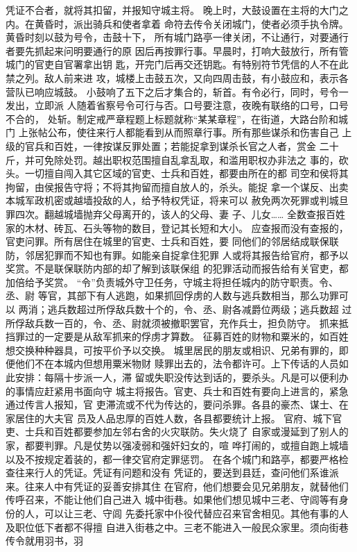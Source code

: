 \documentclass[12pt,UTF8]{ctexbook}
\begin{document}
凭证不合者，就将其扣留，并报知守城主将。 
晚上时，大鼓设置在主将的大门之内。在黄昏时，派出骑兵和使者拿着 
命符去传令关闭城门，使者必须手执令牌。黄昏时刻以鼓为号令，击鼓十下， 
所有城门路亭一律关闭，不让通行，对要通行者要先抓起来问明要通行的原 
因后再按罪行事。早晨时，打响大鼓放行，所有管城门的官吏自官署拿出钥 
匙，开完门后再交还钥匙。有特别符节凭信的人不在此禁之列。敌人前来进 
攻，城楼上击鼓五次，又向四周击鼓，有小鼓应和，表示各营队已响应城鼓。 
小鼓响了五下之后才集合的，斩首。有令必行，同时，号令一发出，立即派 
人随着省察号令可行与否。口号要注意，夜晚有联络的口号，口号不合的， 
处斩。制定戒严章程题上标题就称“某某章程”，在街道，大路台阶和城门 
上张帖公布，使往来行人都能看到从而照章行事。所有那些谋杀和伤害自己 
上级的官兵和百姓，一律按谋反罪处置；若能捉拿到谋杀长官之人者，赏金 
二十斤，并可免除处罚。越出职权范围擅自乱拿乱取，和滥用职权办非法之 
事的，砍头。一切擅自闯入其它区域的官吏、士兵和百姓，都要由所在的都 
司空和侯将其拘留，由侯报告守将；不将其拘留而擅自放人的，杀头。能捉 
拿一个谋反、出卖本城军政机密或越墙投敌的人，给予特权凭证，将来可以 
赦免两次死罪或判城旦罪四次。翻越城墙抛弃父母离开的，该人的父母、妻 
子、儿女…… 
全数查报百姓家的木材、砖瓦、石头等物的数目，登记其长短和大小。 
应查报而没有查报的，官吏问罪。所有居住在城里的官吏、士兵和百姓，要 
同他们的邻居结成联保联防，邻居犯罪而不知也有罪。如能亲自捉拿住犯罪 
人或将其报告给官府，都予以奖赏。不是联保联防内部的却了解到该联保组 
的犯罪活动而报告给有关官吏，都加倍给予奖赏。 
“令”负责城外守卫任务，守城主将担任城内的防守职责。令、丞、尉 
等官，其部下有人逃跑，如果抓回俘虏的人数与逃兵数相当，那么功罪可以 
两消；逃兵数超过所俘敌兵数十个的，令、丞、尉各减爵位两级；逃兵数超 
过所俘敌兵数一百的，令、丞、尉就须被撤职罢官，充作兵士，担负防守。 
抓来抵挡罪过的一定要是从敌军抓来的俘虏才算数。 
征募百姓的财物和粟米的，如百姓想交换种种器具，可按平价予以交换。 
城里居民的朋友或相识、兄弟有罪的，即便他们不在本城内但想用粟米物财 
赎罪出去的，法令都许可。上下传话的人员如此安排：每隔十步派一人，滞 
留或失职没传达到话的，要杀头。凡是可以便利办的事情应赶紧用书面向守 
城主将报告。官吏、兵士和百姓有要向上进言的，紧急通过传言人报知，官 
吏滞流或不代为传达的，要问杀罪。各县的豪杰、谋士、在家居住的大夫官 
员及人品忠厚的百姓人数，各县都要统计上报。 
官府、城下官吏、士兵和百姓都要参加左邻右舍的火灾联防。失火烧了 
自家或漫延到了别人的家，都要判罪。凡是仗势以强凌弱和强奸妇女的，喧 
哗打闹的，或擅自跑上城墙以及不按规定着装的，都一律交官府定罪惩罚。 
在各个城门和路亭，都要严格检查往来行人的凭证。凭证有问题和没有 
凭证的，要送到县廷，查问他们系谁派来。往来人中有凭证的妥善安排其住 
在官府，他们想要会见兄弟朋友，就替他们传呼召来，不能让他们自己进入 
城中街巷。如果他们想见城中三老、守闾等有身份的人，可以让三老、守闾 
先委托家中仆役代替应召来官舍相见。其他有事的人及职位低下者都不得擅 
自进入街巷之中。三老不能进入一般民众家里。须向街巷传令就用羽书，羽 
\end{document}
